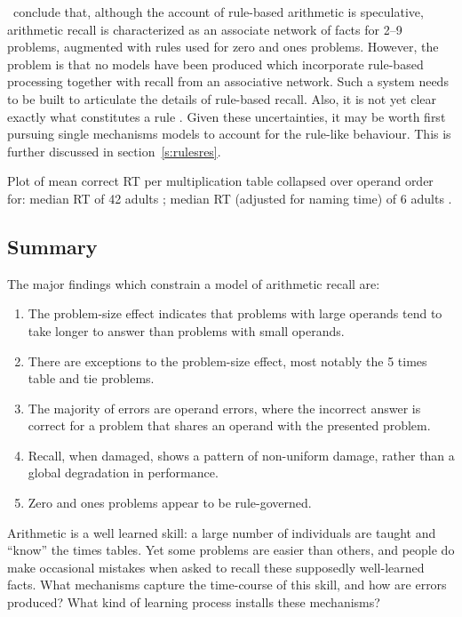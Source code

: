 \citeauthor{mcclfact}\ conclude that, although the account of rule-based
arithmetic is speculative, arithmetic recall is characterized as an
associate network of facts for 2--9 problems, augmented with rules
used for zero and ones problems. However, the problem is that no
models have been produced which incorporate rule-based processing together
with recall from an associative network.  Such a system needs to be built
to articulate the details of rule-based recall.
Also, it is not yet clear exactly what constitutes a rule
\cite{kirswhen,clarasso}. Given these
uncertainties, it may be worth first pursuing single mechanisms models to
account for the rule-like behaviour. This is further discussed in
section~\ref{s:rulesres}.

\begin{fancyfigure}
\centerline{}
\caption{Plot of mean correct RT per multiplication table collapsed
over operand order for: median RT of 42 adults
\protect\cite[appendix~D]{harlasso};
median RT (adjusted for naming time) of 6 adults
\protect\cite[table~A1]{millcogn}.}\label{f:zerortgraph}
\end{fancyfigure}



\subsection{Summary}

The major findings which constrain a model of arithmetic recall are:

\begin{enumerate}
\item The problem-size effect indicates that problems with large operands
tend to take longer to answer than problems with small operands.
\item There are exceptions to the problem-size effect, most notably the 5
times table and tie problems.
\item The majority of errors are operand errors, where the
incorrect answer is
correct for a problem that shares an operand with the presented problem.
\item Recall, when damaged, shows a pattern of non-uniform damage, rather
than a global degradation in performance.
\item Zero and ones problems appear to be rule-governed.
\end{enumerate}

Arithmetic is a well learned skill: a large number of individuals are
taught and ``know'' the times tables.  Yet some problems are easier than
others, and people do make occasional mistakes
when asked to recall these supposedly
well-learned facts.  What mechanisms capture the time-course of this skill,
and how are errors produced?  What kind of learning process installs these
mechanisms?


